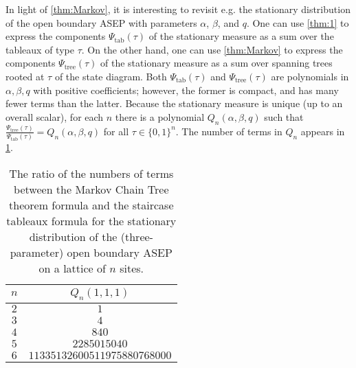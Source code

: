 \documentclass[11pt]{amsart}
\DeclareMathOperator{\tree}{tree}
\DeclareMathOperator{\tab}{tab}
\theoremstyle{definition}
\theoremstyle{remark}
\begin{document}
In light of \cref{thm:Markov},
it is interesting to revisit 
e.g. the stationary distribution
of 
the open boundary ASEP 
with parameters
$\alpha$, $\beta$, and $q$.  
One can use \cref{thm:1} to express the components 
$\Psi_{\tab}(\tau)$ of the stationary measure
as a sum over the tableaux of type $\tau$.
On the other hand, one can use \cref{thm:Markov}
to express the components $\Psi_{\tree}(\tau)$ of the stationary measure
as a sum over spanning trees rooted at $\tau$ 
of the state diagram.
Both $\Psi_{\tab}(\tau)$ and $\Psi_{\tree}(\tau)$ are polynomials
in $\alpha, \beta, q$ with positive coefficients; however,
the former is compact, and has many fewer terms than the latter.
Because the stationary measure is unique (up to an overall scalar), 
for each $n$ there 
is a polynomial $Q_n(\alpha,\beta,q)$ such that 
$\frac{\Psi_{\tree}(\tau)}{\Psi_{\tab}(\tau)}=Q_n(\alpha, \beta,q)$
for all $\tau\in \{0,1\}^n$.  The number of terms in $Q_n$ appears in 
	\cref{table:6}.


\begin{table}[h]
\begin{center}
\begin{tabular}{|c c | }
    \hline
	 $n$ & $Q_n(1, 1, 1)$ \\
    \hline 
	$2$ & $1$\\
	$3$ & $4$\\
	$4$ & 
 $840$\\
	$5$ & 
 $2285015040 $\\
	$6$ & 
$11335132600511975880768000 $\\
    \hline
    \end{tabular}
\end{center}
	\caption{The ratio of the numbers of terms between the Markov Chain Tree theorem
	formula and the staircase tableaux formula for the stationary
	distribution of the (three-parameter) open boundary ASEP on 
	a lattice of $n$ sites.}
	\label{table:6}
\end{table}
\end{document}
